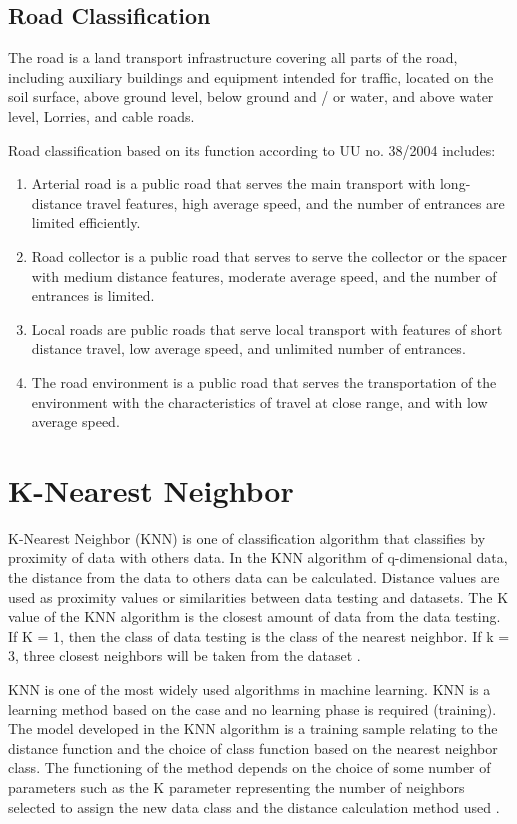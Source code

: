 \subsection{Road Classification}
The road is a land transport infrastructure covering all parts of the road, including auxiliary buildings and equipment intended for traffic, located on the soil surface, above ground level, below ground and / or water, and above water level, Lorries, and cable roads.

Road classification based on its function according to UU no. 38/2004 includes:
\begin{enumerate}[label=- , leftmargin=*, topsep=5pt, itemsep=-1ex, partopsep=1ex, parsep=2ex]
\item Arterial road is a public road that serves the main transport with long-distance travel features, high average speed, and the number of entrances are limited efficiently.
\item Road collector is a public road that serves to serve the collector or the spacer with medium distance features, moderate average speed, and the number of entrances is limited.
\item Local roads are public roads that serve local transport with features of short distance travel, low average speed, and unlimited number of entrances.
\item The road environment is a public road that serves the transportation of the environment with the characteristics of travel at close range, and with low average speed.
\end{enumerate}

\pagebreak

\section{K-Nearest Neighbor}
K-Nearest Neighbor (KNN) is one of classification algorithm that classifies by proximity of data with others data. In the KNN algorithm of q-dimensional data, the distance from the data to others data can be calculated. Distance values are used as proximity values or similarities between data testing and datasets. The K value of the KNN algorithm is the closest amount of data from the data testing. If K = 1, then the class of data testing is the class of the nearest neighbor. If k = 3, three closest neighbors will be taken from the dataset \cite{prasetyo2012}.

KNN is one of the most widely used algorithms in machine learning. KNN is a learning method based on the case and no learning phase is required (training). The model developed in the KNN algorithm is a training sample relating to the distance function and the choice of class function based on the nearest neighbor class. The functioning of the method depends on the choice of some number of parameters such as the K parameter representing the number of neighbors selected to assign the new data class and the distance calculation method used \cite{medjahed2013}.

